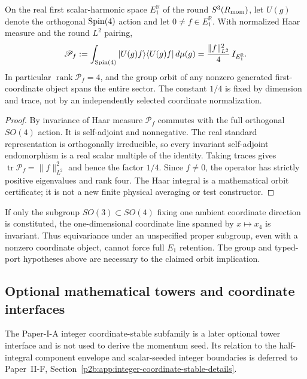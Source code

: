 \documentclass[12pt,a4paper]{article}
\begin{document}
\begin{proposition}
\label{p2b:prop:v281-e1-orbit-frame-certificate}
On the real first scalar-harmonic space \(E_1^{\mathbb R}\) of the
round \(S^3(R_{\mathrm{mom}})\), let \(U(g)\) denote the orthogonal
\(\mathrm{Spin}(4)\) action and let \(0\ne f\in E_1^{\mathbb R}\).
With normalized Haar measure and the round \(L^2\) pairing,
\[
 \mathscr P_f:=\int_{\mathrm{Spin}(4)}
 |U(g)f\rangle\langle U(g)f|\,d\mu(g)
 =\frac{\|f\|_{L^2}^2}{4}\,I_{E_1^{\mathbb R}}.
\]
In particular \(\operatorname{rank}\mathscr P_f=4\), and the group
orbit of any nonzero generated first-coordinate object spans the entire
sector.  The constant \(1/4\) is fixed by dimension and trace, not by
an independently selected coordinate normalization.
\end{proposition}
\begin{proof}
By invariance of Haar measure \(\mathscr P_f\) commutes with the
full orthogonal \(SO(4)\) action.  It is self-adjoint and nonnegative.
The real standard representation is orthogonally irreducible, so every
invariant self-adjoint endomorphism is a real scalar multiple of the
identity.  Taking traces gives
\(\operatorname{tr}\mathscr P_f=\|f\|_{L^2}^2\) and hence the
factor \(1/4\).  Since \(f\neq0\), the operator has strictly
positive eigenvalues and rank four.  The Haar integral is a
mathematical orbit certificate; it is not a new finite physical
averaging or test constructor.
\end{proof}

\begin{remark}
\label{p2b:rem:v281-subgroup-coordinate-counterexample}
If only the subgroup \(SO(3)\subset SO(4)\) fixing one ambient
coordinate direction is constituted, the one-dimensional coordinate
line spanned by \(x\mapsto x_4\) is invariant.  Thus equivariance
under an unspecified proper subgroup, even with a nonzero coordinate
object, cannot force full \(E_1\) retention.  The group and typed-port
hypotheses above are necessary to the claimed orbit implication.
\end{remark}

\subsection{Optional mathematical towers and coordinate interfaces}

\begin{remark}
\label{p2:rem:integer-coordinate-stable-deferred}
The Paper-I-A integer coordinate-stable subfamily is a later optional tower
interface and is not used to derive the momentum seed.  Its relation to the
half-integral component envelope and scalar-seeded integer boundaries is
deferred to Paper~II-F, Section~\ref{p2b:app:integer-coordinate-stable-details}.
\end{remark}
\end{document}
